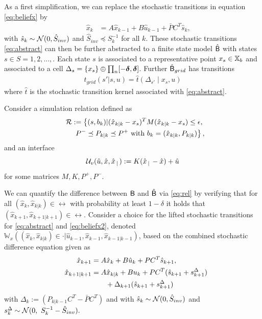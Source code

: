 \documentclass{ifacconf}
\begin{document}
 
As a first simplification, we can replace the stochastic transitions  in equation \eqref{eq:beliefx} by
\begin{align}  
		&&\hat x_k &=A\hat x_{k-1} +B\hat u_{k-1} + \bar P  C^T  \hat{s}_k,\label{eq:abstract} 
\end{align}
with $ \hat{s}_k\sim \mathcal{N} (0,\hat{S}_{inv})$ and $\hat{S}_{inv}\preceq S_k^{-1}$ for all $k$.
These stochastic transitions \eqref{eq:abstract} can then be further abstracted to a finite state model $\hat{\mathsf{B}}$ with states $s\in S=1,2,..., $. Each state $s$ is associated to a representative point $x_s\in {{\mathbb{X}}_b}$ and associated to a 
cell $\Delta_s=\{x_s\} \oplus \prod_n [-\boldsymbol{\delta}, \boldsymbol{\delta}]$.
Further $\hat{\mathsf{B}}_{grid}$  has transitions 
\begin{align}\label{eq:tgrid}
t_{grid}(s'|s,u)=\hat t \left(\Delta_{s'}\mid x_s, u\right)
\end{align}where $\hat t$ is the stochastic transition kernel associated with \eqref{eq:abstract}.


Consider a simulation relation defined as 
	\begin{align}\label{eq:rel}
\mathcal{R} := \left\{(s,b_k)| (\hat x_{k|k}-x_s)^T M(\hat x_{k|k}-x_s)\leq \epsilon, \right.\\\qquad\left.  P^-\preceq P_{k|k} \preceq   P^+ \mbox{ with } b_k=(\hat x_{k|k}, P_{k|k} ) \right\},\notag
	\end{align}
and an interface 
\[\mathcal{U}_{v}(\hat u, \hat x, \hat x_{\,|\,}):=K( \hat x_{\,|\,} -\hat x)+\hat u\]
for some matrices $M, K,P^+,P^-$.


We can quantify the difference between $\mathsf{B}$ and $\hat{\mathsf{B}}$ via \eqref{eq:rel} by verifying that for all  $(\hat x_k,\hat x_{k|k})\in \rel$ with probability at least $1-\delta$ it holds that $(\hat x_{k+1},\hat x_{k+1|k+1})\in \rel$. 
Consider a choice for the lifted stochastic  transitions  for \eqref{eq:abstract} and \eqref{eq:beliefx2},  denoted 
	$ \mathbb W_{x}((\hat x_k, \hat x_{k|k})\in \cdot| \hat u_{k-1}, \hat x_{k-1}, \hat x_{k-1|k-1})$, based on the combined stochastic difference equation given as
\begin{align*}
		&&\hat x_{k+1} &=A\hat x_{k} +B\hat u_{k} + \bar P  C^T  \hat{s}_{k+1},\\%
	&&\hat x_{k+1|k+1}&=A\hat x_{k|k}+Bu_{k}+  \bar P   C^T(  \hat{s}_{k+1}+s^\Delta_{k+1})\notag\\&&&\qquad+\Delta_{k+1}( \hat{s}_{k+1}+ s^\Delta_{k+1})%
\end{align*}
 with $\Delta_k:=(P_{k|k-1}C^T-  \bar P   C^T)$ and with $ \hat{s}_k\sim \mathcal{N} (0,\hat{S}_{inv})$ and $ s^\Delta_k\sim  \mathcal{N} (0,\  S_k^{-1}-\hat{S}_{inv}). $
\end{document}
